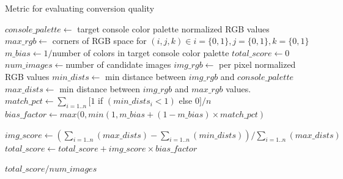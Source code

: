 \documentclass[10pt,twocolumn,letterpaper]{article}
\begin{document}
\begin{algorithm*}
   \caption{Metric for evaluating conversion quality}
   \begin{algorithmic}
      \label{alg:alg1}

      \STATE $console\_palette \leftarrow$ target console color palette normalized RGB values
      \STATE $max\_rgb \leftarrow$ corners of RGB space for $(i, j, k) \in i=\{0,1\}, j=\{0,1\}, k=\{0,1\}$
      \STATE $m\_bias \leftarrow 1 / $number of colors in target console color palette
      \STATE $total\_score \leftarrow 0$
      \STATE $num\_images \leftarrow $number of candidate images
      \STATE
      \STATE $img\_rgb \leftarrow $ per pixel normalized RGB values
      \STATE $min\_dists \leftarrow $ min distance between $img\_rgb$ and $console\_palette$
      \STATE $max\_dists \leftarrow $ min distance between $img\_rgb$ and $max\_rgb$ values.
      \STATE $match\_pct \leftarrow \sum_{i=1..n}[ 1 $ if $(min\_dists_i < 1)$ else $0] / n$
      \STATE $bias\_factor \leftarrow max(0, min(1, m\_bias + (1 - m\_bias) \times match\_pct)$

      \STATE $img\_score \leftarrow (\sum_{i=1..n}(max\_dists) - \sum_{i=1..n}(min\_dists)) / \sum_{i=1..n}(max\_dists)$
      \STATE $total\_score \leftarrow total\_score + img\_score \times bias\_factor$

      \ENDFOR

      \RETURN $total\_score/num\_images$

   \end{algorithmic}
\end{algorithm*}

{\small


}
\end{document}
